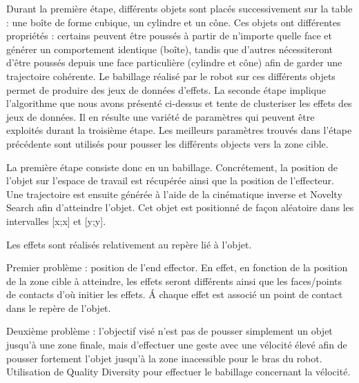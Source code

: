 \documentclass{llncs}
\begin{document}
Durant la première étape, différents objets sont placés successivement sur la table : une boîte de forme cubique, un cylindre et un cône. Ces objets ont différentes propriétés : certains peuvent être poussés à partir de n'importe quelle face et générer un comportement identique (boîte), tandis que d'autres nécessiteront d'être poussés depuis une face particulière (cylindre et cône) afin de garder une trajectoire cohérente. Le babillage réalisé par le robot sur ces différents objets permet de produire des jeux de données d'effets.
La seconde étape implique l'algorithme que nous avons présenté ci-dessus et tente de clusteriser les effets des jeux de données. Il en résulte une variété de paramètres qui peuvent être exploités durant la troisième étape.
Les meilleurs paramètres trouvés dans l'étape précédente sont utilisés pour pousser les différents objects vers la zone cible.

La première étape consiste donc en un babillage. Concrétement, la position de l'objet sur l'espace de travail est récupérée ainsi que la position de l'effecteur. Une trajectoire est ensuite générée à l'aide de la cinématique inverse et Novelty Search afin d'atteindre l'objet. Cet objet est positionné de façon aléatoire dans les intervalles [x;x] et [y;y].



Les effets sont réalisés relativement au repère lié à l'objet.

Premier problème : position de l'end effector. En effet, en fonction de la position de la zone cible à atteindre, les effets seront différents ainsi que les faces/points de contacts d'où initier les effets. \'A chaque effet est associé un point de contact dans le repère de l'objet.

Deuxième problème : l'objectif visé n'est pas de pousser simplement un objet jusqu'à une zone finale, mais d'effectuer une geste avec une vélocité élevé afin de pousser fortement l'objet jusqu'à la zone inacessible pour le bras du robot. Utilisation de Quality Diversity pour effectuer le babillage concernant la vélocité.
\end{document}
